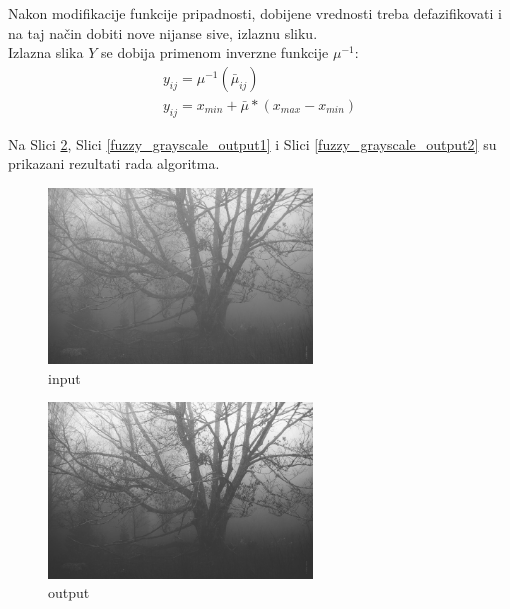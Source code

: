 \documentclass[12pt,a4paper]{article}
\theoremstyle{definition}
\theoremstyle{remark}
\theoremstyle{plain}
\begin{document}
Nakon modifikacije funkcije pripadnosti, dobijene vrednosti treba defazifikovati i na taj na\v cin dobiti nove nijanse sive, izlaznu sliku.\\
Izlazna slika $Y$ se dobija primenom inverzne funkcije $\mu^{-1}$:\\
\begin{align*}
  y_{ij} = \mu^{-1}(\bar\mu_{ij})\\
  y_{ij} = x_{min} + \bar\mu * (x_{max} - x_{min})
\end{align*}

Na Slici \ref{tree_fuzzy_grayscale_output}, Slici \ref{fuzzy_grayscale_output1} i Slici \ref{fuzzy_grayscale_output2} su prikazani rezultati rada algoritma.

\begin{multicols}{2}
\begin{figure}[H]
\centering
\includegraphics[width=7cm]{images/tree.jpg}
  \caption{input}\label{tree_fuzzy_grayscale_input}
\end{figure}
\columnbreak
\begin{figure}[H]
\centering
\includegraphics[width=7cm]{images/fuzzy_grayscale_0.jpg}
  \caption{output}\label{tree_fuzzy_grayscale_output}
\end{figure}
\end{multicols}
\end{document}
